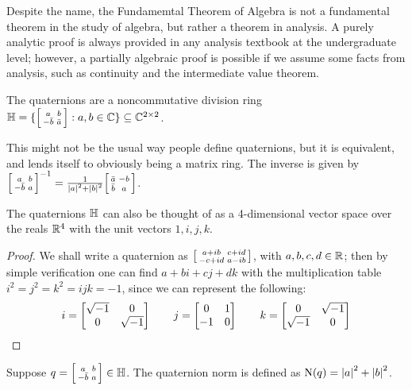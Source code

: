 \begin{remark}
    Despite the name, the Fundamemtal Theorem of Algebra
    is not a fundamental theorem in the study of algebra,
    but rather a theorem in analysis.
    A purely analytic proof is always provided
    in any analysis textbook at the undergraduate level;
    however, a partially algebraic proof is possible
    if we assume some facts from analysis,
    such as continuity and the intermediate value theorem.
\end{remark}

\begin{definition}
    The quaternions are a noncommutative division ring
    \(\bH = \{\smqty[a&b \\ -\bar{b}&\bar{a}] : a,b \in \bC\}
    \subseteq \bC^{2 \times 2}\).
\end{definition}
\begin{remark}
    This might not be the usual way people define quaternions,
    but it is equivalent, and lends itself to obviously being a matrix ring.
    The inverse is given by \({\smqty[a&b \\ -\bar{b}&a]}^{-1}
    = \frac{1}{\abs{a}^2+\abs{b}^2}\smqty[\bar{a}&-b \\ \bar{b}&a]\).
\end{remark}
\begin{proposition}
    The quaternions \(\mathbb{H}\) can also be thought of
    as a 4-dimensional vector space over the reals \(\mathbb{R}^4\)
    with the unit vectors \(1,i,j,k\).
\end{proposition}
\begin{proof}
    We shall write a quaternion as \(\smqty[a+ib&c+id \\ -c+id&a-ib]\),
    with \(a,b,c,d \in \mathbb{R}\);
    then by simple verification one can find
    \(a + bi + cj + dk\) with the multiplication table \(i^2=j^2=k^2=ijk=-1\),
    since we can represent the following:
    \begin{equation*}
        i = \begin{bmatrix} \sqrt{-1} & 0 \\ 0 & \sqrt{-1} \end{bmatrix} \qquad
        j = \begin{bmatrix} 0 & 1 \\ -1 & 0 \end{bmatrix} \qquad
        k = \begin{bmatrix} 0 & \sqrt{-1} \\ \sqrt{-1} & 0 \end{bmatrix}
    \end{equation*}
\end{proof}

\begin{definition}
    Suppose \(q = \smqty[a&b \\ -\bar{b}&a] \in \bH\).
    The quaternion norm is defined as
    \(\operatorname{N}(q) = \abs{a}^2 + \abs{b}^2\).
\end{definition}


